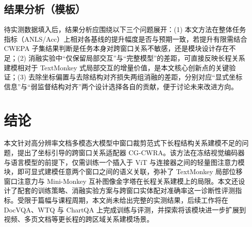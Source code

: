 \documentclass[journal]{IEEEtran}
\begin{document}
\subsection{结果分析（模板）}
待实测数据填入后，结果分析应围绕以下三个问题展开：(1) 本文方法在整体任务指标（ANLS/Acc）上相对各基线的提升幅度是否与预期一致，若提升有限需结合 CWEPA 子集结果判断是任务本身对跨窗口关系不敏感，还是模块设计存在不足；(2) 消融实验中“仅保留局部交互”与“完整模型”的差距，可直接反映长程关系建模相对于 TextMonkey 式局部交互的增量价值，是本文核心创新点的关键验证；(3) 去除坐标偏置与去除结构对齐损失两组消融的差距，分别对应“显式坐标信息”与“弱监督结构对齐”两个设计选择各自的贡献，便于讨论未来改进方向。

\section{结论}
本文针对高分辨率文档多模态大模型中窗口裁剪范式下长程结构关系建模不足的问题，提出了坐标引导的跨窗口关系适配器 CG-CWRA。该方法在冻结视觉编码器与语言模型的前提下，仅需训练一个插入于 ViT 与连接器之间的轻量图注意力模块，即可显式建模任意两个窗口之间的语义关联，弥补了 TextMonkey 局部位移窗口注意力与 Mini-Monkey 互补图像金字塔在长程关系建模上的局限。本文还设计了配套的训练策略、消融实验方案与跨窗口实体配对准确率这一诊断性评测指标。受限于篇幅与课程周期，本文尚未给出完整的实测结果，后续工作将在 DocVQA、WTQ 与 ChartQA 上完成训练与评测，并探索将该模块进一步扩展到视频、多页文档等更长程的跨区域关系建模场景。
\end{document}
